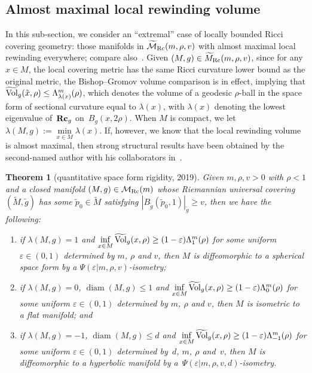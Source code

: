 \documentclass[10pt,a4paper]{amsart}
\numberwithin{equation}{section}
\newtheorem{Theorem}{Theorem}[section]
\DeclareMathOperator{\diam}{diam}
\newcommand{\Rc}{\operatorname{\bf Rc}}
\begin{document}
\subsection{Almost maximal local rewinding volume}\label{section3.2}
In this sub-section, we consider an ``extremal'' case of locally bounded
Ricci covering geometry: those manifolds in
$\widetilde{\mathcal{M}}_{\rm Rc}(m,\rho,v)$ with almost maximal local rewinding
everywhere; compare also~\cite{Colding96}. Given $(M,g)\in
\widetilde{M}_{\rm Rc}(m,\rho,v)$, since for any $x\in M$, the local covering
metric has the same Ricci curvature lower bound as the original metric, the
Bishop--Gromov volume comparison is in effect, implying that
$\widetilde{\rm Vol}_g(\tilde{x},\rho)\le \Lambda_{\lambda(x)}^m(\rho)$, which
denotes the volume of a geodesic $\rho$-ball in the space form of sectional
curvature equal to $\lambda(x)$, with $\lambda(x)$ denoting the lowest
eigenvalue of~$\Rc_g$ on~$B_g(x,2\rho)$. When $M$ is compact, we let
$\lambda(M,g):=\min\limits_{x\in M}\lambda(x)$. If, however, we know that the local
rewinding volume is almost maximal, then strong structural results have been
obtained by the second-named author with his collaborators in~\cite{CRX18, CRX19}.
\begin{Theorem}[quantitative space form rigidity, 2019]\label{thm: CRX19a}
Given $m,\rho,v>0$ with $\rho<1$ and a closed manifold $(M,g) \in
\mathcal{M}_{\rm Rc}(m)$ whose Riemannian universal covering $(\tilde{M},
\tilde{g})$ has some $\tilde{p}_0\in \tilde{M}$ satisfying $|B_{\tilde{g}}
(\tilde{p}_0,1) |_{\tilde{g}}\ge v$, then we have the following:
\begin{enumerate}\itemsep=0pt
 \item[$1)$] if $\lambda(M,g)=1$ and $\inf\limits_{x\in M}
 \widetilde{\rm Vol}_g(x,\rho)\ge (1-\varepsilon)\Lambda_{1}^m(\rho)$ for some
 uniform $\varepsilon\in (0,1)$ determined by $m$, $\rho$ and $v$, then $M$ is
 diffeomorphic to a spherical space form by a
 $\Psi(\varepsilon|m,\rho,v)$-isometry;
 \item[$2)$] if $\lambda(M,g)=0$, $\diam (M,g)\le 1$ and $\inf\limits_{x\in M}
 \widetilde{\rm Vol}_g(x,\rho)\ge (1-\varepsilon)\Lambda_0^m(\rho)$ for some
 uniform $\varepsilon\in (0,1)$ determined by $m$, $\rho$ and $v$, then $M$ is
 isometric to a flat manifold; and
 \item[$3)$] if $\lambda(M,g)=-1$, $\diam (M,g)\le d$ and $\inf\limits_{x\in M}
 \widetilde{\rm Vol}_g(x,\rho)\ge (1-\varepsilon)\Lambda_{-1}^m(\rho)$ for some
 uniform $\varepsilon\in (0,1)$ determined by~$d$, $m$, $\rho$ and~$v$, then
 $M$ is diffeomorphic to a hyperbolic manifold by a~$\Psi(\varepsilon|m,\rho,v,d)$-isometry.
\end{enumerate}
\end{Theorem}
\end{document}
